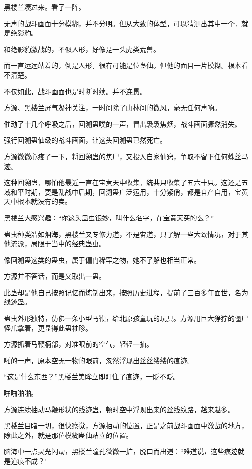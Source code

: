 \begin{this_body}
黑楼兰凑过来。看了一阵。

无声的战斗画面十分模糊，并不分明。但从大致的体型，可以猜测出其中一个，就是绝影豹。

和绝影豹激战的，不似人形，好像是一头虎类荒兽。

而一直远远站着的，倒是人形，很有可能是位蛊仙。但他的面目一片模糊。根本看不清楚。

不仅如此，战斗画面也是时断时续。并不连贯。

方源、黑楼兰屏气凝神关注，一时间除了山林间的微风，毫无任何声响。

催动了十几个呼吸之后，回溯蛊噗的一声，冒出袅袅焦烟，战斗画面骤然消失。

强行回溯蛊仙级的战斗画面，让这头回溯蛊已然死亡。

方源微微心疼了一下，将回溯蛊的焦尸，又投入自家仙窍，争取不留下任何蛛丝马迹。

这种回溯蛊，哪怕他最近一直在宝黄天中收集，统共只收集了五六十只。这还是五域和平时期，要是乱战中后期，回溯蛊广泛运用，十分紧俏，都是自产自用，宝黄天中根本就没有的卖。

黑楼兰大感兴趣：“你这头蛊虫很妙，叫什么名字，在宝黄天买的么？”

蛊虫种类浩如烟海，黑楼兰又专修力道，不是宙道，只了解一些大致情况，对于其他流派，局限于当中的经典蛊虫。

像回溯蛊这类的蛊虫，属于偏门稀罕之物，她不了解也相当正常。

方源并不答话，而是又取出一蛊。

此蛊却是他自己按照记忆而炼制出来，按照历史进程，提前了三百多年面世，名为线迹蛊。

蛊虫外形独特，仿佛一条小型马鞭，给北原孩童玩的玩具。方源用巨大狰狞的僵尸怪爪拿着，更显得此蛊袖珍。

方源抓着马鞭柄部，对准眼前的空气，轻轻一抽。

啪的一声，原本空无一物的眼前，忽然浮现出丝丝缕缕的痕迹。

“这是什么东西？”黑楼兰美眸立即盯住了痕迹，一眨不眨。

啪啪啪啪。

方源连续抽动马鞭形状的线迹蛊，顿时空中浮现出来的丝线纹路，越来越多。

黑楼兰目睹一切，很快察觉，方源抽动的位置，正是之前战斗画面中激战的地方，除此之外，就是那位模糊蛊仙站立的位置。

脑海中一点灵光闪动，黑楼兰瞳孔微微一扩，脱口而出道：“难道说，这些痕迹就是道痕不成？”


\end{this_body}
